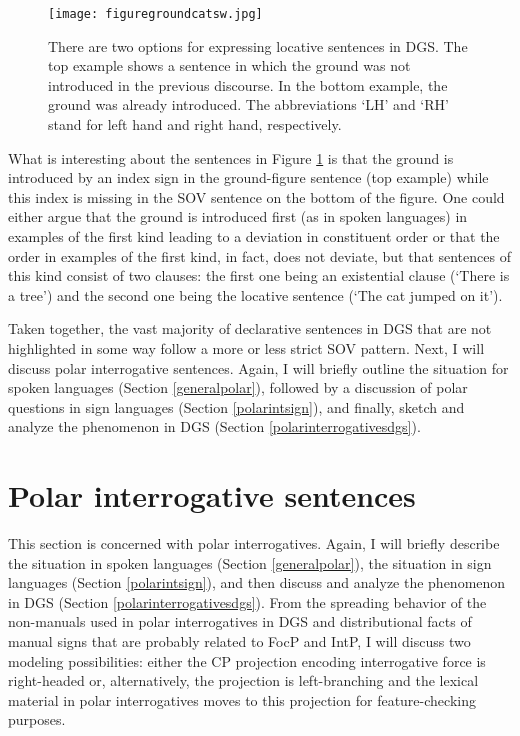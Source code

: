 \begin{figure}[b]
\centering
	\texttt{[image: figuregroundcatsw.jpg]}
	\caption{There are two options for expressing locative sentences in DGS. The top example shows a sentence in which the ground was not introduced in the previous discourse. In the bottom example, the ground was already introduced. The abbreviations `LH' and `RH' stand for left hand and right hand, respectively.}
	\label{fig:figuregroundcat}
\end{figure}

\clearpage
What is interesting about the sentences in Figure \ref{fig:figuregroundcat} is that the ground is introduced by an index sign in the ground-figure sentence (top example) while this index is missing in the SOV sentence on the bottom of the figure. One could either argue that the ground is introduced first (as in spoken languages) in examples of the first kind leading to a deviation in constituent order or that the order in examples of the first kind, in fact, does not deviate, but that sentences of this kind consist of two clauses: the first one being an existential clause (`There is a tree') and the second one being the locative sentence (`The cat jumped on it').

Taken together, the vast majority of declarative sentences in DGS that are not highlighted in some way follow a more or less strict SOV pattern. Next, I will discuss polar interrogative sentences. Again, I will briefly outline the situation for spoken languages (Section \ref{generalpolar}), followed by a discussion of polar questions in sign languages (Section \ref{polarintsign}), and finally, sketch and analyze the phenomenon in DGS (Section \ref{polarinterrogativesdgs}).

\largerpage
\section{Polar interrogative sentences}\label{polargeneralsectionlabel}
This section is concerned with polar interrogatives. Again, I will briefly describe the situation in spoken languages (Section \ref{generalpolar}), the situation in sign languages (Section \ref{polarintsign}), and then discuss and analyze the phenomenon in DGS (Section \ref{polarinterrogativesdgs}). From the spreading behavior of the non-manuals used in polar interrogatives in DGS and distributional facts of manual signs that are probably related to FocP and IntP, I will discuss two modeling possibilities: either the  CP projection encoding interrogative force is right-headed or, alternatively, the projection is left-branching and the lexical material in polar interrogatives moves to this projection for feature-checking purposes. %


